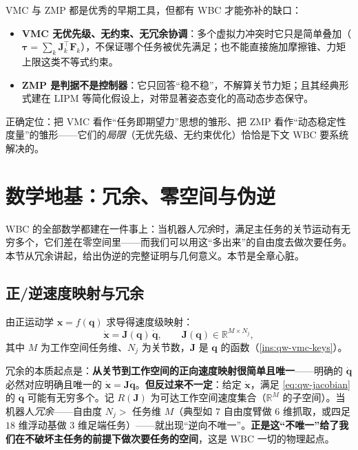 \begin{pitfall}
VMC 与 ZMP 都是优秀的早期工具，但都有 WBC 才能弥补的缺口：
\begin{itemize}
  \item \textbf{VMC 无优先级、无约束、无冗余协调}：多个虚拟力冲突时它只是简单叠加（$\boldsymbol{\tau}=\sum_k\boldsymbol{J}_k^\top\boldsymbol{F}_k$），不保证哪个任务被优先满足；也不能直接施加摩擦锥、力矩上限这类不等式约束。
  \item \textbf{ZMP 是判据不是控制器}：它只回答“稳不稳”，不解算关节力矩；且其经典形式建在 LIPM 等简化假设上，对带显著姿态变化的高动态步态保守。
\end{itemize}
正确定位：把 VMC 看作“任务即期望力”思想的雏形、把 ZMP 看作“动态稳定性度量”的雏形——它们的\emph{局限}（无优先级、无约束优化）恰恰是下文 WBC 要系统解决的。
\end{pitfall}

\section{数学地基：冗余、零空间与伪逆}
\label{sec:qw-nullspace}

WBC 的全部数学都建在一件事上：当机器人\emph{冗余}时，满足主任务的关节运动有无穷多个，它们差在零空间里——而我们可以用这“多出来”的自由度去做次要任务。本节从冗余讲起，给出伪逆的完整证明与几何意义。本节是全章心脏。

\subsection{正/逆速度映射与冗余}
\label{subsec:qw-redundancy}

由正运动学 $\boldsymbol{x}=f(\boldsymbol{q})$ 求导得速度级映射\cite{yu2021quadruped}：
\begin{equation}
  \dot{\boldsymbol{x}}=\boldsymbol{J}(\boldsymbol{q})\,\dot{\boldsymbol{q}},\qquad
  \boldsymbol{J}(\boldsymbol{q})\in\mathbb{R}^{M\times N_j},
  \label{eq:qw-jacobian}
\end{equation}
其中 $M$ 为工作空间任务维、$N_j$ 为关节数，$\boldsymbol{J}$ 是 $\boldsymbol{q}$ 的函数（\cref{ins:qw-vmc-keys}）。

\begin{insight}\label{ins:qw-fwd-inv}
冗余的本质起点是：\textbf{从关节到工作空间的正向速度映射很简单且唯一}——明确的 $\dot{\boldsymbol{q}}$ 必然对应明确且唯一的 $\dot{\boldsymbol{x}}=\boldsymbol{J}\dot{\boldsymbol{q}}$。\textbf{但反过来不一定}：给定 $\dot{\boldsymbol{x}}$，满足 \cref{eq:qw-jacobian} 的 $\dot{\boldsymbol{q}}$ 可能有无穷多个。记 $R(\boldsymbol{J})$ 为可达工作空间速度集合（$\mathbb{R}^M$ 的子空间）。当机器人\emph{冗余}——自由度 $N_j>$ 任务维 $M$（典型如 $7$ 自由度臂做 $6$ 维抓取，或四足 $18$ 维浮动基做 $3$ 维足端任务）——就出现“逆向不唯一”。\textbf{正是这“不唯一”给了我们在不破坏主任务的前提下做次要任务的空间}，这是 WBC 一切的物理起点。
\end{insight}


